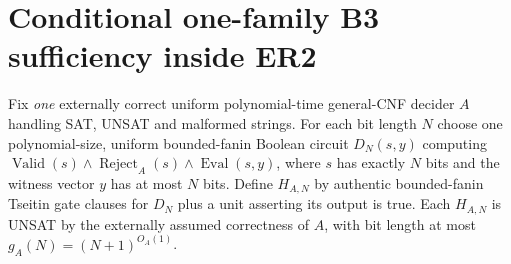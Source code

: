 \documentclass[11pt]{article}
\begin{document}
\section*{Conditional one-family B3 sufficiency inside ER2}
Fix \emph{one} externally correct uniform polynomial-time general-CNF decider $A$ handling SAT, UNSAT and malformed strings. For each bit length $N$ choose one polynomial-size, uniform bounded-fanin Boolean circuit $D_N(s,y)$ computing
$\operatorname{Valid}(s)\land\operatorname{Reject}_A(s)\land\operatorname{Eval}(s,y)$,
where $s$ has exactly $N$ bits and the witness vector $y$ has at most $N$ bits. Define $H_{A,N}$ by authentic bounded-fanin Tseitin gate clauses for $D_N$ plus a unit asserting its output is true. Each $H_{A,N}$ is UNSAT by the externally assumed correctness of $A$, with bit length at most $g_A(N)=(N+1)^{O_A(1)}$.
\end{document}
